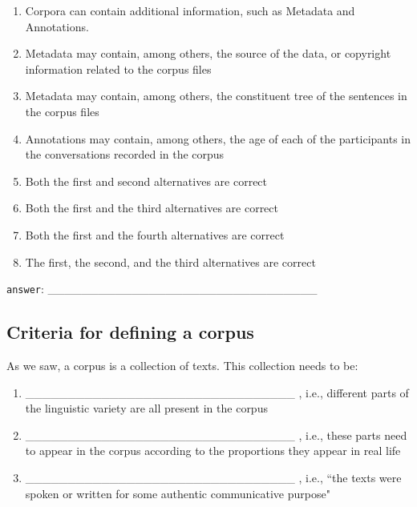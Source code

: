 \documentclass[a4paper,11pt]{scrartcl}
\begin{document}
\begin{enumerate}[label=\alph*)]
\onehalfspacing
\item Corpora can contain additional information, such as Metadata and
      Annotations.

\item Metadata may contain, among others, the source of the data, or copyright
      information related to the corpus files

\item Metadata may contain, among others, the constituent tree of the sentences
      in the corpus files

\item Annotations may contain, among others, the age of each of the participants
      in the conversations recorded in the corpus

\item Both the first and second alternatives are correct

\item Both the first and the third alternatives are correct

\item Both the first and the fourth alternatives are correct

\item The first, the second, and the third alternatives are correct
\end{enumerate}

\verb|answer|: \_\_\_\_\_\_\_\_\_\_\_\_\_\_\_\_\_\_\_\_\_\_\_\_\_\_\_\_\_\_\_\_


\subsection{Criteria for defining a corpus}

As we saw, a corpus is a collection of texts. This collection needs to be:

\begin{enumerate}[label=\alph*)]
\onehalfspacing
\item \_\_\_\_\_\_\_\_\_\_\_\_\_\_\_\_\_\_\_\_\_\_\_\_\_\_\_\_\_\_\_\_ , i.e.,
      different parts of the linguistic variety are all present in the corpus
\item \_\_\_\_\_\_\_\_\_\_\_\_\_\_\_\_\_\_\_\_\_\_\_\_\_\_\_\_\_\_\_\_ , i.e.,
      these parts need to appear in the corpus according to the proportions
      they appear in real life
\item \_\_\_\_\_\_\_\_\_\_\_\_\_\_\_\_\_\_\_\_\_\_\_\_\_\_\_\_\_\_\_\_ , i.e.,
      ``the texts were spoken or written for some authentic communicative purpose"
\end{enumerate}
\end{document}

